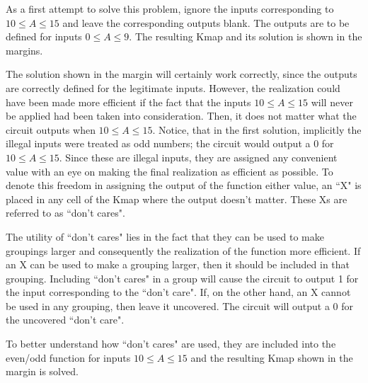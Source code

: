 \begin{changemargin}{1.5cm}{1.5cm}
As a first attempt to solve this problem, ignore the inputs
corresponding to $10 \le A \le 15$ and leave the
corresponding outputs blank.  The outputs are to be defined
for inputs $0 \le A \le 9$. The resulting Kmap and its solution
is shown in the margins.


The solution shown in the margin will certainly work correctly,
since the outputs are correctly defined for the legitimate inputs.
However, the realization could have been made more efficient
if the fact that the inputs $10 \le A \le 15$ will never be applied
had been taken into consideration. Then, it does not matter what the
circuit outputs when $10 \le A \le 15$.  Notice, that in the first
solution, implicitly
the illegal inputs were treated as odd numbers; the circuit would
output a 0 for $10 \le A \le 15$. Since these are illegal inputs,
they are assigned any convenient value with an eye on making
the final realization as
efficient as possible.  To denote this freedom in assigning the
output of the function either value, an ``X" is placed in any
cell of the Kmap where the output doesn't matter.  These
Xs are referred to as ``don't cares".

The utility of ``don't cares" lies in the fact that they can be
used to make groupings larger and consequently the realization
of the function more efficient.  If an X can be used to make a
grouping larger, then it should be included in that grouping.
Including ``don't cares" in a group will cause the circuit to
output 1 for the input corresponding to the ``don't care".
If, on the other hand,
an X cannot be used in any grouping, then leave it uncovered.
The circuit will output a 0 for the uncovered ``don't care".

To better understand how ``don't cares" are used, they are included
into the even/odd function for inputs $10 \le A \le 15$ and the
resulting Kmap shown in the margin is solved.


\end{changemargin}
